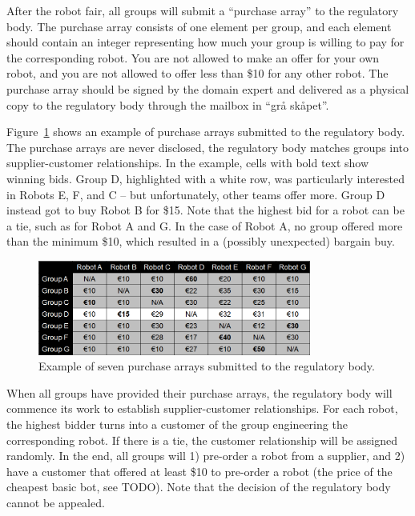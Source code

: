 \documentclass{scrreprt}
\begin{document}
After the robot fair, all groups will submit a ``purchase array'' to the regulatory body. The purchase array consists of one element per group, and each element should contain an integer representing how much your group is willing to pay for the corresponding robot. You are not allowed to make an offer for your own robot, and you are not allowed to offer less than \$10 for any other robot. The purchase array should be signed by the domain expert and delivered as a physical copy to the regulatory body through the mailbox in ``grå skåpet''.

Figure~\ref{fig:array} shows an example of purchase arrays submitted to the regulatory body. The purchase arrays are never disclosed, the regulatory body matches groups into supplier-customer relationships. In the example, cells with bold text show winning bids. Group D, highlighted with a white row, was particularly interested in Robots E, F, and C -- but unfortunately, other teams offer more. Group D instead got to buy Robot B for \$15. Note that the highest bid for a robot can be a tie, such as for Robot A and G. In the case of Robot A, no group offered more than the minimum \$10, which resulted in a (possibly unexpected) bargain buy. 

\begin{figure}
\centering
\includegraphics[width=0.80\textwidth]{figures/purchaseArray.png}
\caption{Example of seven purchase arrays submitted to the regulatory body.}
\label{fig:array}
\end{figure}


When all groups have provided their purchase arrays, the regulatory body will commence its work to establish supplier-customer relationships. For each robot, the highest bidder turns into a customer of the group engineering the corresponding robot. If there is a tie, the customer relationship will be assigned randomly. In the end, all groups will 1) pre-order a robot from a supplier, and 2) have a customer that offered at least \$10 to pre-order a robot (the price of the cheapest basic bot, see TODO). Note that the decision of the regulatory body cannot be appealed. 
\end{document}
